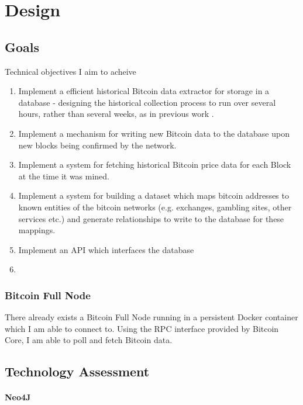 \chapter{Design}

\section{Goals}
Technical objectives I aim to acheive
\begin{enumerate}
    \item Implement a efficient historical Bitcoin data extractor for storage in a database - designing the historical collection process to run over several hours, rather than several weeks, as in previous work \cite{RefWorks:doc:5c98e031e4b068320632cef2}.
    \item Implement a mechanism for writing new Bitcoin data to the database upon new blocks being confirmed by the network.
    \item Implement a system for fetching historical Bitcoin price data for each Block at the time it was mined.
    \item Implement a system for building a dataset which maps bitcoin addresses to known entities of the bitcoin networks (e.g. exchanges, gambling sites, other services etc.) and generate relationships to write to the database for these mappings.
    \item Implement an API which interfaces the database
    \item {}
\end{enumerate}


\subsection{Bitcoin Full Node}
There already exists a Bitcoin Full Node running in a persistent Docker container which I am able to connect to. Using the RPC interface provided by Bitcoin Core, I am able to poll and fetch Bitcoin data. 

\section{Technology Assessment}


\subsubsection{Neo4J}





